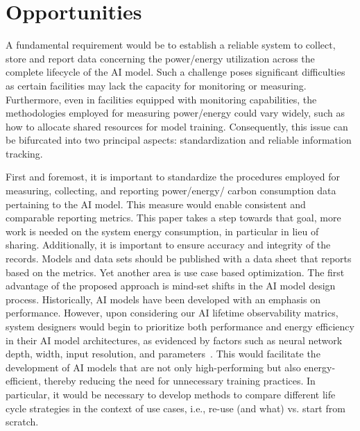 \section{Opportunities}
\label{opportunities}
A fundamental requirement would be to establish a reliable system to collect, store and report data concerning the power/energy utilization across the complete lifecycle of the AI model. Such a challenge poses significant difficulties as certain facilities may lack the capacity for monitoring or measuring. Furthermore, even in facilities equipped with monitoring capabilities, the methodologies employed for measuring power/energy could vary widely, such as how to allocate shared resources for model training. Consequently, this issue can be bifurcated into two principal aspects: standardization and reliable information tracking.

First and foremost, it is important to standardize the procedures employed for measuring, collecting, and reporting {power/energy/} carbon consumption data pertaining to the AI model. This measure would enable consistent and comparable reporting metrics. This paper takes a step towards that goal, more work is needed on the system energy consumption, in particular in lieu of sharing. Additionally, it is important to ensure accuracy and integrity of the records. 
Models and data sets should be published with a data sheet that reports based on the metrics. 
%
Yet another area is use case based optimization. The first advantage of the proposed approach is mind-set shifts in the AI model design process. Historically, AI models have been developed with an emphasis on performance. However, upon considering our AI lifetime observability matrics, system designers would begin to prioritize both performance and energy efficiency in their AI model architectures, as evidenced by factors such as neural network depth, width, input resolution, and parameters~\cite{DESISLAVOV2023100857}. This would facilitate the development of AI models that are not only high-performing but also energy-efficient, thereby reducing the need for unnecessary training practices. In particular, it would be necessary to develop methods to compare different life cycle strategies in the context of use cases, i.e., re-use (and what) vs. start from scratch. 

